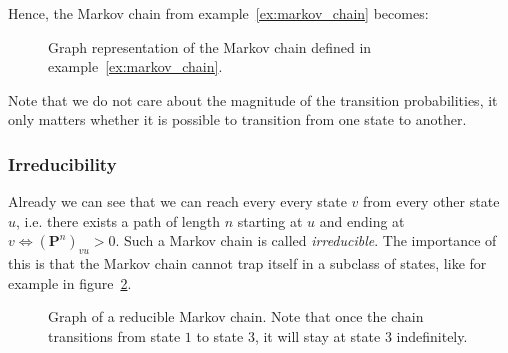 \documentclass[../../main.tex]{subfiles}
\begin{document}
Hence, the Markov chain from example~\ref{ex:markov_chain} becomes:

\begin{figure}[h]
    \center
    \caption{Graph representation of the Markov chain defined in example~\ref{ex:markov_chain}.}
    \label{fig:markov_chain}
\end{figure}

Note that we do not care about the magnitude of the transition probabilities, it only matters whether it is possible to transition from one state to another.

\subsubsection{Irreducibility}
Already we can see that we can reach every every state $v$ from every other state $u$, i.e. there exists a path of length $n$ starting at $u$ and ending at $v \iff (\bm{P}^n)_{vu} > 0$. Such a Markov chain is called \emph{irreducible}. The importance of this is that the Markov chain cannot trap itself in a subclass of states, like for example in figure~\ref{fig:markov_chain_reducible}.

\begin{figure}[h]
    \center
    \caption{Graph of a reducible Markov chain. Note that once the chain transitions from state $1$ to state $3$, it will stay at state $3$ indefinitely.}
    \label{fig:markov_chain_reducible}
\end{figure}
\end{document}
